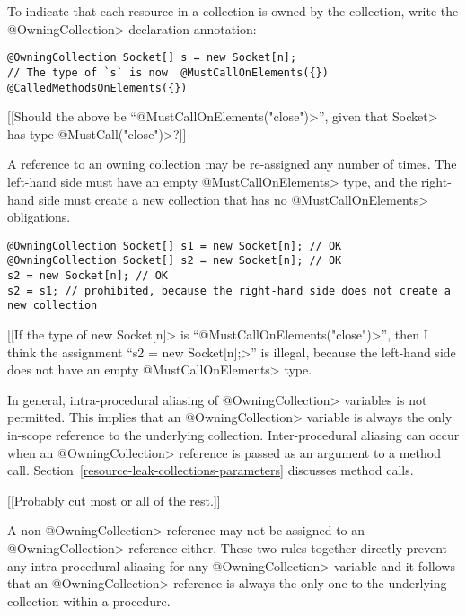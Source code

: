 
To indicate that each resource in a collection is owned by the collection, write the \<@OwningCollection> declaration annotation:

\begin{Verbatim}
@OwningCollection Socket[] s = new Socket[n];
// The type of `s` is now  @MustCallOnElements({}) @CalledMethodsOnElements({})
\end{Verbatim}

[[Should the above be ``\<@MustCallOnElements("close")>'', given that \<Socket>
has type \<@MustCall("close")>?]]

A reference to an owning collection may be re-assigned any number of times.
The left-hand side must have an empty \<@MustCallOnElements> type, and the
right-hand side must create a new collection that has no
\<@MustCallOnElements> obligations.

\begin{verbatim}
@OwningCollection Socket[] s1 = new Socket[n]; // OK
@OwningCollection Socket[] s2 = new Socket[n]; // OK
s2 = new Socket[n]; // OK
s2 = s1; // prohibited, because the right-hand side does not create a new collection
\end{verbatim}

[[If the type of \<new Socket[n]> is ``\<@MustCallOnElements("close")>'', then I
think the assignment ``\<s2 = new Socket[n];>'' is illegal, because the
left-hand side does not have an empty \<@MustCallOnElements> type.

In general, intra-procedural aliasing of \<@OwningCollection> variables is not
permitted.  This implies that an \<@OwningCollection> variable is always the
only in-scope reference to the underlying collection.  Inter-procedural aliasing can
occur when an \<@OwningCollection> reference is passed as an argument to a
method call.  Section~\ref{resource-leak-collections-parameters} discusses
method calls.



[[Probably cut most or all of the rest.]]

A non-\<@OwningCollection> reference may not be assigned to an \<@OwningCollection> reference either. These two rules together directly prevent any intra-procedural aliasing for any \<@OwningCollection> variable and it follows that an \<@OwningCollection> reference is always the only one to the underlying collection within a procedure.





